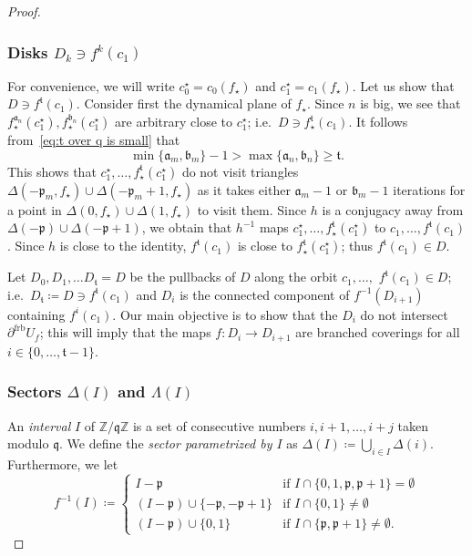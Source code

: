 \documentclass[]{amsart}
\newcommand{\str}{{\star}}
\newcommand{\pp}{\mathfrak{p}}
\renewcommand{\aa}{{\mathfrak{a}}}
\newcommand{\bb}{{\mathfrak{b}}}
\renewcommand{\qq}{\mathfrak{q}}
\renewcommand{\tt}{\mathfrak{t}}
\newcommand\frb{{\operatorname{frb}}}
\newcommand{\Z}{\mathbb{Z}}
\theoremstyle{remark}
\numberwithin{equation}{section}
\theoremstyle{definition}
\begin{document}
\begin{proof}
\subsubsection{Disks $D_k\ni f^{k}(c_1)$}  For convenience, we will write $c^\str_0 = c_0(f_\str)$ and $c^\str_1 = c_1(f_\str)$. Let us show that $D\ni f^{\tt}(c_1)$. Consider first the dynamical plane of $f_\str$. Since $n$ is big, we see that $f_\str^{\aa_n}(c^\str_1), f_\str^{\bb_n}(c^\str_1)$ are arbitrary close to $c^\str_1$; i.e.~$D\ni f^{\tt}_\str(c_1)$. It follows from~\eqref{eq:t over q is small} that  
\begin{equation}
\label{eq:a_n less than a_m}
\min\{\aa_m, \bb_m\}-1>  \max\{\aa_n, \bb_n\}\ge \tt.
\end{equation}
This shows that $c^\str_1, \dots , f_\str^{\tt}(c^\str_1)$ do not visit triangles $ \Delta( -\pp_m,f_\str) \cup  \Delta( -\pp_m+1,f_\str)$ as it takes either $\aa_m-1$ or $\bb_m-1$ iterations for a point in $ \Delta( 0,f_\str) \cup  \Delta(1,f_\str)$ to visit them. Since $h$ is a conjugacy away from $ \Delta( -\pp) \cup  \Delta( -\pp+1)$, we obtain that $h^{-1}$ maps $c^\str_1, \dots , f_\str^{\tt}(c^\str_1)$ to  $c_1, \dots , f^{\tt}(c_1)$. Since $h$ is close to the identity, $f^{\tt}(c_1)$ is close to $f_\str^{\tt}(c^\str_1)$; thus $f^\tt(c_1)\in D$.


 Let $D_{0}, D_{1},\dots  D_{\tt}=D$ be the pullbacks of $D$ along the orbit $c_1,\dots,$ $f^\tt(c_1)\in D$; i.e.~$D_\tt\coloneqq D\ni f^\tt(c_1)$ and $D_{i}$ is the connected component of $f^{-1}(D_{i+1})$ containing $f^{i}(c_1)$. Our main objective is to show that the $D_{i}$ do not intersect $\partial ^\frb U_f$; this will imply that the maps $f\colon D_{i}\to D_{i+1}$ are branched coverings for all $i\in \{0,\dots, \tt-1\}$. 



\subsubsection{Sectors $ \Delta(I)$ and $ \Lambda(I)$}
\label{sss:Delta Lambda}
An \emph{interval} $I$ of $\Z/\qq\Z$ is a set of consecutive numbers $i,i+1,\dots , i+j $ taken modulo $\qq$. We define the \emph{sector parametrized by $I$} as $\displaystyle{\Delta(I)\coloneqq \bigcup _{i\in I}\Delta(i)}$. Furthermore, we let
\begin{equation}
\label{eq:DefnI_k}
f^{-1}(I)\coloneqq \begin{cases} I-\pp&\text{if } I\cap \{0,1,\pp,\pp+1\} =\emptyset \\
      (I -\pp)\cup  \{-\pp,-\pp+1\} & \text{if } I\cap \{0,1\} \not =\emptyset\\
      (I -\pp)\cup  \{0,1\} &\text{if } I\cap \{\pp,\pp+1\} \not =\emptyset.
    \end{cases}
\end{equation}



\end{proof}
\end{document}

